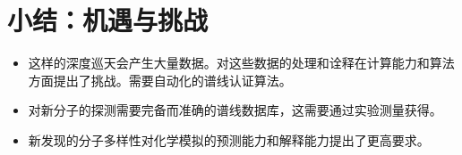 \documentclass{report}
\begin{document}
\section{小结：机遇与挑战}

\begin{itemize}
  \item
这样的深度巡天会产生大量数据。对这些数据的处理和诠释在计算能力和算法方面提出了挑战。需要自动化的谱线认证算法。
  \item
对新分子的探测需要完备而准确的谱线数据库，这需要通过实验测量获得。
  \item
新发现的分子多样性对化学模拟的预测能力和解释能力提出了更高要求。
\end{itemize}  




\begingroup
\renewcommand{\section}[2]{}%

\endgroup
\end{document}
